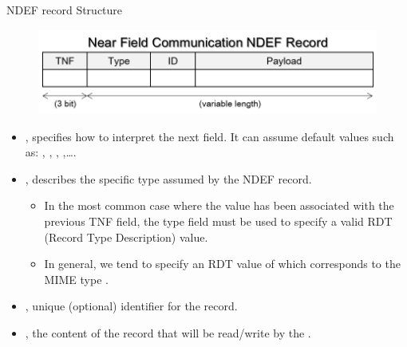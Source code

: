 \documentclass{beamer}
\begin{document}
  \begin{frame}[allowframebreaks]{NDEF record Structure}
    \begin{figure}
      \includegraphics[width=1\linewidth]{figures/nfc_ndef_record.png}
    \end{figure}

    \begin{itemize}\itemsep20pt
      \item {}, specifies how to interpret the next
       field. It can assume default values such as: ,
      , ,
      ,\dots.
      \item {}, describes the specific type assumed by the NDEF record.
      \begin{itemize}
        \item In the most common case where the  value
        has been associated with the previous TNF field, the type field must be
        used to specify a valid RDT (Record Type Description) value.
        \item In general, we tend to specify an RDT value of  which
        corresponds to the MIME type .
      \end{itemize} 
      \item {}, unique (optional) identifier for the record.
      \item {}, the content of the record that will be read/write by
      the .
    \end{itemize}
  \end{frame}
\end{document}
